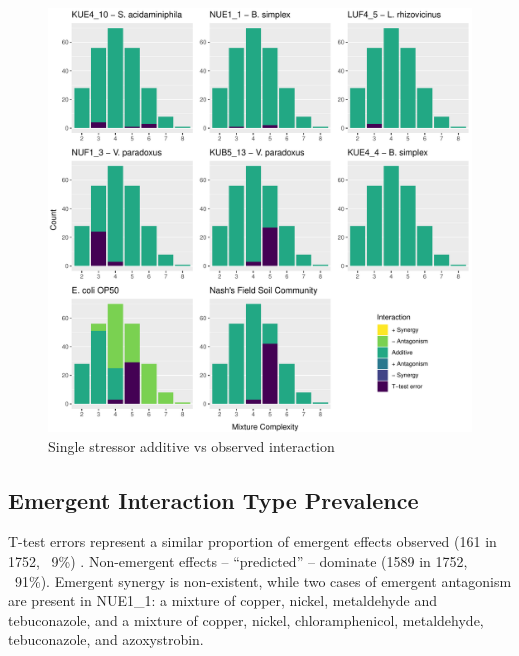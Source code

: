 \documentclass[final,1p,times]{elsarticle}
\begin{document}
\begin{figure}[hb]
    \centering
    \includegraphics[width = \textwidth]{Scripts/Results/Final_Pipeline/histogram_interaction_basic.pdf}
    \caption{Single stressor additive vs observed interaction}
    \label{fig:histogram_interaction_basic}
\end{figure}

\newpage
\subsection{Emergent Interaction Type Prevalence}
\label{S:3:8}

T-test errors represent a similar proportion of emergent effects observed (161 in 1752, ~9\%) . Non-emergent effects – “predicted” – dominate (1589 in 1752, ~91\%). Emergent synergy is non-existent, while two cases of emergent antagonism are present in NUE1\_1: a mixture of copper, nickel, metaldehyde and tebuconazole, and a mixture of copper, nickel, chloramphenicol, metaldehyde, tebuconazole, and azoxystrobin.
\end{document}
